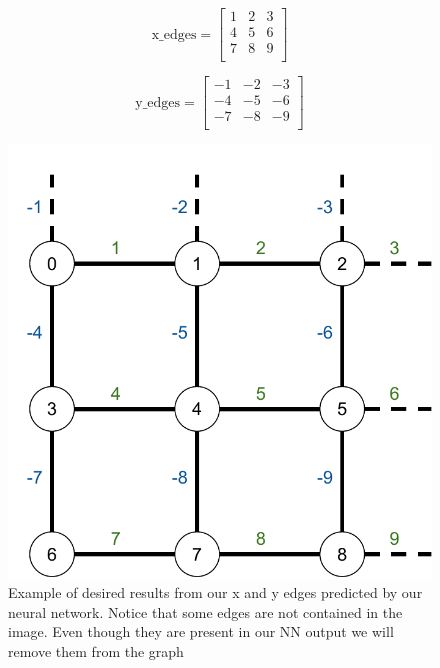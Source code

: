 \begin{figure}[!htbp]
\centering
\begin{minipage}[c]{0.2\textwidth}
\centering
\[
	\text{x\_edges}=
  \begin{bmatrix}
	  1 & 2 & 3 \\
	  4 & 5 & 6 \\
	  7 & 8 & 9 \\
  \end{bmatrix}
\]
\end{minipage}\hfill
\begin{minipage}[c]{0.2\textwidth}
\centering
\[
	\text{y\_edges}=
  \begin{bmatrix}
	  -1 & -2 & -3 \\
	  -4 & -5 & -6 \\
	  -7 & -8 & -9 \\
  \end{bmatrix}
\]

\end{minipage}\hfill
\begin{minipage}[c]{0.45\textwidth}
\centering
    \includegraphics[width=\textwidth]{./images/edge_weights_predicted.pdf}
\end{minipage}

    \caption{Example of desired results from our x and y edges predicted by our
	neural network. Notice that some edges are not contained in the image. Even
though they are present in our NN output we will remove them from the graph}
    \label{fig:ew_predicted}
\end{figure}

